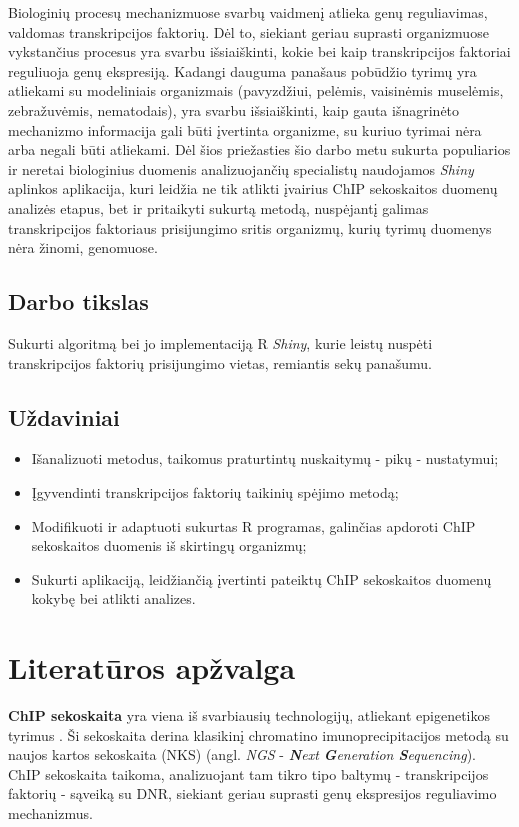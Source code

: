 \documentclass[12pt]{article}
\begin{document}
Biologinių procesų mechanizmuose svarbų vaidmenį atlieka genų reguliavimas,
valdomas transkripcijos faktorių. Dėl to, siekiant geriau suprasti organizmuose
vykstančius procesus yra svarbu išsiaiškinti, kokie bei kaip transkripcijos
faktoriai reguliuoja genų ekspresiją. Kadangi dauguma panašaus pobūdžio tyrimų
yra atliekami su modeliniais organizmais \cite{ARTICLE19} (pavyzdžiui, pelėmis,
vaisinėmis muselėmis, zebražuvėmis, nematodais), yra svarbu išsiaiškinti,
kaip gauta išnagrinėto mechanizmo informacija gali būti įvertinta organizme,
su kuriuo tyrimai nėra arba negali būti atliekami. Dėl šios priežasties šio
darbo metu sukurta populiarios ir neretai biologinius duomenis analizuojančių
specialistų naudojamos \emph{Shiny} aplinkos aplikacija, kuri leidžia
ne tik atlikti įvairius ChIP sekoskaitos duomenų analizės etapus, bet ir
pritaikyti sukurtą metodą, nuspėjantį galimas transkripcijos faktoriaus
prisijungimo sritis organizmų, kurių tyrimų duomenys nėra žinomi, genomuose.

\subsection*{Darbo tikslas}
Sukurti algoritmą bei jo implementaciją R \emph{Shiny}, kurie leistų nuspėti
transkripcijos faktorių prisijungimo vietas, remiantis sekų panašumu.

\subsection*{Uždaviniai}
\begin{itemize}
    \item Išanalizuoti metodus, taikomus praturtintų nuskaitymų - pikų -
          nustatymui;
    \item Įgyvendinti transkripcijos faktorių taikinių spėjimo metodą;
    \item Modifikuoti ir adaptuoti sukurtas R programas, galinčias apdoroti
          ChIP sekoskaitos duomenis iš skirtingų organizmų;          
    \item Sukurti aplikaciją, leidžiančią įvertinti pateiktų ChIP sekoskaitos
          duomenų kokybę bei atlikti analizes.
\end{itemize}

\newpage


\section{Literatūros apžvalga}
\textbf{ChIP sekoskaita} yra viena iš svarbiausių technologijų, atliekant
epigenetikos tyrimus \cite{ARTICLE1}. Ši sekoskaita derina klasikinį chromatino
imunoprecipitacijos metodą su naujos kartos sekoskaita (NKS)
(angl. \emph{NGS} - \emph{\textbf{N}ext \textbf{G}eneration \textbf{S}equencing}).
ChIP sekoskaita taikoma, analizuojant tam tikro tipo baltymų - transkripcijos
faktorių - sąveiką su DNR, siekiant geriau suprasti genų ekspresijos reguliavimo
mechanizmus.
\end{document}
